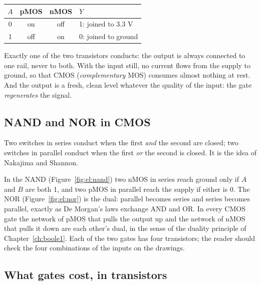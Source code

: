 \begin{center}\small
\begin{tabular}{@{}cccl@{}}
\toprule
$A$ & \textbf{pMOS} & \textbf{nMOS} & $Y$\\
\midrule
0 & on & off & 1: joined to 3.3 V\\
1 & off & on & 0: joined to ground\\
\bottomrule
\end{tabular}
\end{center}

Exactly one of the two transistors conducts: the output is always connected to
one rail, never to both. With the input still, no current flows from the
supply to ground, so that CMOS (\emph{complementary} MOS) consumes almost
nothing at rest. And the output is a fresh, clean level whatever the quality
of the input: the gate \emph{regenerates} the signal.

\subsection{NAND and NOR in CMOS}

\begin{prgconcept}
Two switches in series conduct when the first \emph{and} the second are
closed; two switches in parallel conduct when the first \emph{or} the second
is closed. It is the idea of Nakajima and Shannon.
\end{prgconcept}

In the NAND (Figure~\ref{fig:el:nand}) two nMOS in series reach ground only
if $A$ and $B$ are both 1, and two pMOS in parallel reach the supply if either
is 0. The NOR (Figure~\ref{fig:el:nor}) is the dual: parallel becomes series
and series becomes parallel, exactly as De Morgan's laws exchange AND and OR.
In every CMOS gate the network of pMOS that pulls the output up and the
network of nMOS that pulls it down are each other's dual, in the sense of the
duality principle of Chapter~\ref{ch:boole1}. Each of the two gates has four
transistors; the reader should check the four combinations of the inputs on
the drawings.

\subsection{What gates cost, in transistors}

